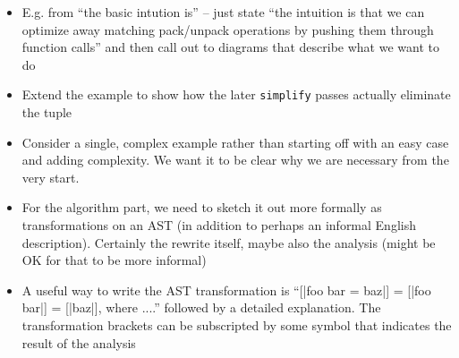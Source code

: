 \documentclass[leqno,11pt]{article}
\begin{document}
\begin{itemize}
\begin{itemize}
  \item E.g. from ``the basic intution is'' -- just state ``the intuition is
    that we can optimize away matching pack/unpack operations by pushing them
    through function calls'' and then call out to diagrams that describe what we
    want to do

  \item Extend the example to show how the later \texttt{simplify} passes
    actually eliminate the tuple

  \item Consider a single, complex example rather than starting off with an easy
    case and adding complexity. We want it to be clear why we are necessary from
    the very start.

  \item For the algorithm part, we need to sketch it out more formally as
    transformations on an AST (in addition to perhaps an informal English
    description). Certainly the rewrite itself, maybe also the analysis (might
    be OK for that to be more informal)

  \item A useful way to write the AST transformation is ``[|foo bar = baz|] =
    [|foo bar|] = [|baz|], where ....'' followed by a detailed explanation. The
    transformation brackets can be subscripted by some symbol that indicates the
    result of the analysis 

  \end{itemize}

\end{itemize}
\end{document}

